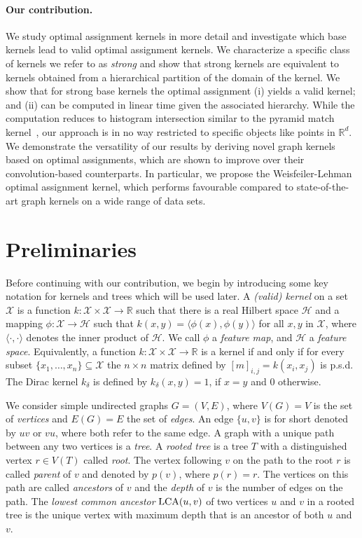 \documentclass{article}
\newcommand{\X}{\ensuremath{\mathcal{X}}\xspace}
\newcommand{\Hilb}{\ensuremath{\mathcal{H}}\xspace}
\newcommand{\bbR}[0]{\ensuremath{\mathbb{R}}\xspace}
\begin{document}
\paragraph{Our contribution.}
We study optimal assignment kernels in more detail and investigate which base 
kernels lead to valid optimal assignment kernels. We characterize a specific 
class of kernels we refer to as \emph{strong} and show that strong kernels are 
equivalent to kernels obtained from a hierarchical partition of the domain 
of the kernel. We show that for strong base kernels the optimal assignment 
(i) yields a valid kernel; and (ii) can be computed in linear time given the
associated hierarchy.
While the computation reduces to histogram intersection similar to the
pyramid match kernel~\cite{Grauman2007}, our approach is in no way restricted 
to specific objects like points in $\bbR^d$. We demonstrate the versatility
of our results by deriving novel graph kernels based on optimal assignments, 
which are shown to improve over their convolution-based counterparts.
In particular, we propose the Weisfeiler-Lehman optimal assignment kernel, which
performs favourable compared to state-of-the-art graph kernels on a wide range 
of data sets.



\section{Preliminaries}
Before continuing with our contribution, we begin by introducing some key notation
for kernels and trees which will be used later.
A \emph{(valid) kernel} on a set \X is a function 
$k : \X \times \X \to \mathbb{R}$ such that there is a real 
Hilbert space $\Hilb$ and a mapping $\phi : \X \to \Hilb$ 
such that $k(x,y) = \langle \phi(x), \phi(y) \rangle$ for all $x,y$ in \X, 
where $\langle \cdot, \cdot \rangle$ denotes the inner product of $\Hilb$. 
We call $\phi$ a \emph{feature map}, and $\Hilb$ a \emph{feature space}. 
Equivalently, a function $k : \X \times \X \to \mathbb{R}$ is a kernel
if and only if for every subset $\{x_1,\dots,x_n\} \subseteq \X$ the 
$n\times n$ matrix defined by $[m]_{i,j} = k(x_i,x_j)$ is p.s.d.
The Dirac kernel $k_\delta$ is defined by $k_\delta(x,y) = 1$, if $x=y$ and $0$ 
otherwise.


We consider simple undirected graphs $G=(V,E)$, where $V(G) = V$ is the set of 
\emph{vertices} and $E(G)=E$ the set of \emph{edges}. An edge $\{u,v\}$ is for
short denoted by $uv$ or $vu$, where both refer to the same edge.
A graph with a unique path between any two vertices is a \emph{tree}.
A \emph{rooted tree} is a tree $T$ with a distinguished vertex $r \in V(T)$ 
called \emph{root}.
The vertex following $v$ on the path to the root $r$ is called \emph{parent} of 
$v$ and denoted by $p(v)$, where $p(r) = r$.
The vertices on this path are called \emph{ancestors} of $v$ and the \emph{depth} 
of $v$ is the number of edges on the path.
The \emph{lowest common ancestor} ${\rm LCA}(u,v)$ of two vertices $u$ and $v$ 
in a rooted tree is the unique vertex with maximum depth that is an ancestor of
both $u$ and $v$.
\end{document}
